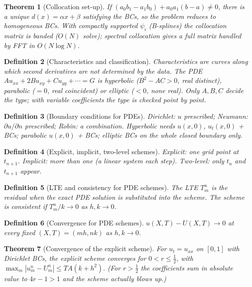\documentclass[10pt,a4paper]{article}
\theoremstyle{tight}
\newtheorem{theorem}{Theorem}[section]
\newtheorem{definition}[theorem]{Definition}
\begin{document}
\begin{theorem}[Collocation set-up]
If \((a_0b_1-a_1b_0)+a_0a_1(b-a)\ne0\), there is a unique \(d(x)=\alpha x+\beta\) satisfying the BCs,
so the problem reduces to homogeneous BCs. With compactly supported \(\psi_i\) (B-splines) the
collocation matrix is banded (\(O(N)\) solve); spectral collocation gives a full matrix handled by FFT
in \(O(N\log N)\).
\end{theorem}

\begin{definition}[Characteristics and classification]
Characteristics are curves along which second derivatives are not determined by the data. The PDE
\(Au_{xx}+2Bu_{xy}+Cu_{yy}+\cdots=G\) is hyperbolic (\(B^2-AC>0\), real distinct), parabolic
(\(=0\), real coincident) or elliptic (\(<0\), none real). Only \(A,B,C\) decide the type; with
variable coefficients the type is checked point by point.
\end{definition}

\begin{definition}[Boundary conditions for PDEs]
Dirichlet: \(u\) prescribed; Neumann: \(\partial u/\partial n\) prescribed; Robin: a combination.
Hyperbolic needs \(u(x,0)\), \(u_t(x,0)\) + BCs; parabolic \(u(x,0)\) + BCs; elliptic BCs on the whole
closed boundary only.
\end{definition}

\begin{definition}[Explicit, implicit, two-level schemes]
Explicit: one grid point at \(t_{n+1}\). Implicit: more than one (a linear system each step).
Two-level: only \(t_n\) and \(t_{n+1}\) appear.
\end{definition}

\begin{definition}[LTE and consistency for PDE schemes]
The LTE \(T_m^n\) is the residual when the exact PDE solution is substituted into the scheme.
The scheme is consistent if \(T_m^n/k\to0\) as \(h,k\to0\).
\end{definition}

\begin{definition}[Convergence for PDE schemes]
\(u(X,T)-U(X,T)\to0\) at every fixed \((X,T)=(mh,nk)\) as \(h,k\to0\).
\end{definition}

\begin{theorem}[Convergence of the explicit scheme]
For \(u_t=u_{xx}\) on \([0,1]\) with Dirichlet BCs, the explicit scheme converges for
\(0<r\le\frac12\), with \(\max_m|u_m^n-U_m^n|\le TA(k+h^2)\). (For \(r>\frac12\) the coefficients sum
in absolute value to \(4r-1>1\) and the scheme actually blows up.)
\end{theorem}
\end{document}
